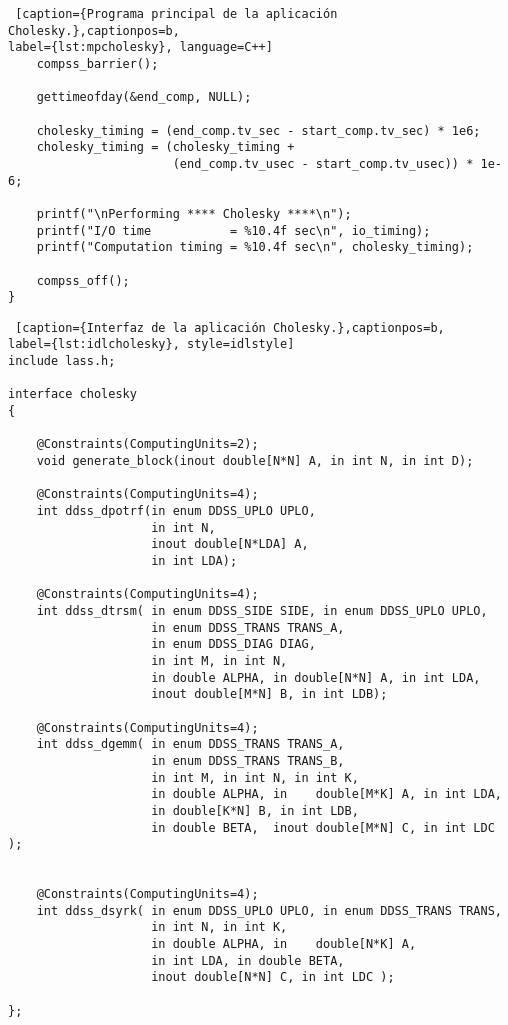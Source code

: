 \begin{lstlisting} [caption={Programa principal de la aplicación Cholesky.},captionpos=b, 
label={lst:mpcholesky}, language=C++]
    compss_barrier();

    gettimeofday(&end_comp, NULL);

    cholesky_timing = (end_comp.tv_sec - start_comp.tv_sec) * 1e6;
    cholesky_timing = (cholesky_timing + 
					   (end_comp.tv_usec - start_comp.tv_usec)) * 1e-6; 

    printf("\nPerforming **** Cholesky ****\n");
    printf("I/O time           = %10.4f sec\n", io_timing);
    printf("Computation timing = %10.4f sec\n", cholesky_timing);

    compss_off(); 
}
\end{lstlisting}

\begin{minipage}{\linewidth}
\begin{lstlisting} [caption={Interfaz de la aplicación Cholesky.},captionpos=b, 
label={lst:idlcholesky}, style=idlstyle]
include lass.h;
  
interface cholesky
{

    @Constraints(ComputingUnits=2);
    void generate_block(inout double[N*N] A, in int N, in int D);

    @Constraints(ComputingUnits=4);
    int ddss_dpotrf(in enum DDSS_UPLO UPLO, 
					in int N, 
					inout double[N*LDA] A, 
					in int LDA);

    @Constraints(ComputingUnits=4);
    int ddss_dtrsm( in enum DDSS_SIDE SIDE, in enum DDSS_UPLO UPLO,
                    in enum DDSS_TRANS TRANS_A, 
					in enum DDSS_DIAG DIAG,
                    in int M, in int N,
                    in double ALPHA, in double[N*N] A, in int LDA,
                    inout double[M*N] B, in int LDB);

    @Constraints(ComputingUnits=4);
    int ddss_dgemm( in enum DDSS_TRANS TRANS_A, 
					in enum DDSS_TRANS TRANS_B,
                    in int M, in int N, in int K,
                    in double ALPHA, in    double[M*K] A, in int LDA,
                    in double[K*N] B, in int LDB,
                    in double BETA,  inout double[M*N] C, in int LDC );


    @Constraints(ComputingUnits=4);
    int ddss_dsyrk( in enum DDSS_UPLO UPLO, in enum DDSS_TRANS TRANS,
                    in int N, in int K,
                    in double ALPHA, in    double[N*K] A, 
					in int LDA, in double BETA,  
					inout double[N*N] C, in int LDC );

};
\end{lstlisting}
\end{minipage}